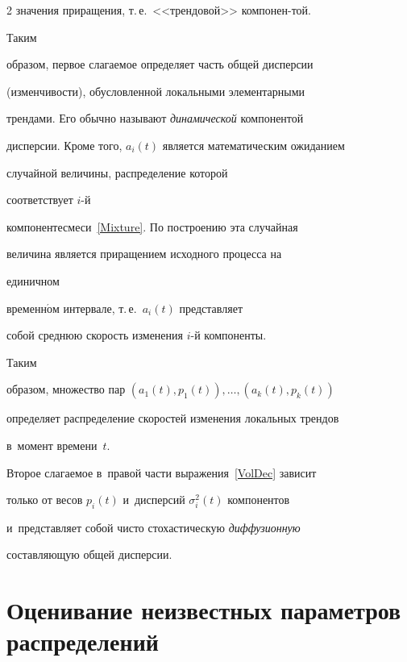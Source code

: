 \begin{multicols}{2}
значения приращения, т.\,е.\ <<трендовой>> компонен-\linebreak той. 





Таким


образом, первое слагаемое определяет часть общей дисперсии


(изменчивости), обуслов\-лен\-ной локальными элементарными


трендами. Его обычно называют \textit{динамической} компонентой


дисперсии. Кроме того, $a_i(t)$ является математическим ожиданием


случайной величины, распределение которой %


соответствует $i$-й


компоненте\linebreak смеси~\eqref{Mixture}. По построению эта случайная


величина является приращением исходного процесса на {\it


единичном} временн$\acute{\mbox{о}}$м интервале, т.\,е.\ $a_i(t)$ представляет


собой среднюю  скорость изменения  \mbox{$i$-й} компоненты.


%


 Таким


образом, множество пар $(a_1(t),p_1(t)),\ldots,(a_k(t),p_k(t))$


определяет распределение скоростей изменения локальных трендов


в~момент времени~$t$.


{ %





}





Второе слагаемое в~правой части выражения~\eqref{VolDec} зависит


только от весов $p_i(t)$ и~дисперсий $\sigma_i^2(t)$ компонентов 


и~представляет собой чисто стохастическую \textit{диффузионную}


составляющую общей дис\-персии.





\section{Оценивание неизвестных параметров распределений}






\end{multicols}
